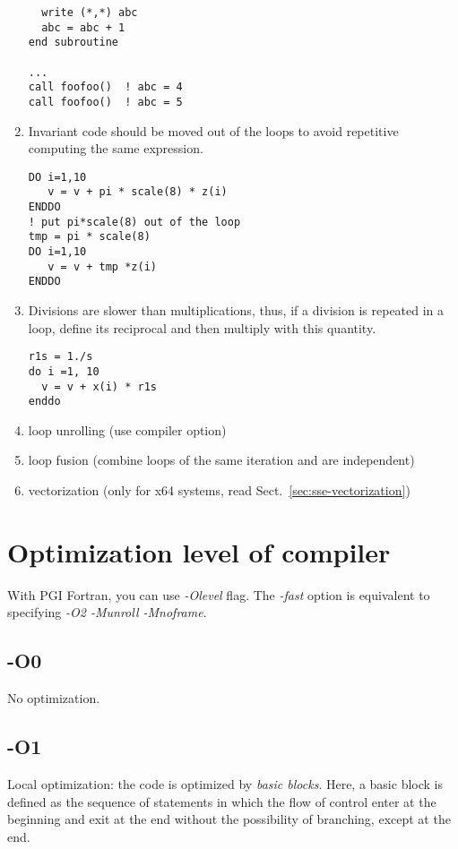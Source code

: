 \begin{enumerate}
\begin{verbatim}
  write (*,*) abc
  abc = abc + 1
end subroutine

...
call foofoo()  ! abc = 4
call foofoo()  ! abc = 5
\end{verbatim}

\item Invariant code should be moved out of the loops to avoid
  repetitive computing the same expression.
\begin{lstlisting}
DO i=1,10
   v = v + pi * scale(8) * z(i)
ENDDO
! put pi*scale(8) out of the loop
tmp = pi * scale(8)
DO i=1,10 
   v = v + tmp *z(i)
ENDDO
\end{lstlisting}

\item Divisions are slower than multiplications, thus, if a division
  is repeated in a loop, define its reciprocal and then multiply with
  this quantity.
\begin{lstlisting}
r1s = 1./s
do i =1, 10
  v = v + x(i) * r1s
enddo
\end{lstlisting}

\item loop unrolling (use compiler option)

\item loop fusion (combine loops of the same iteration and are
  independent) 

\item vectorization (only for x64 systems, read
  Sect.~\ref{sec:sse-vectorization})
\end{enumerate}

\section{Optimization level of compiler}
\label{sec:optimization-level}

With PGI Fortran, you can use {\it -Olevel} flag.  The {\it -fast}
option is equivalent to specifying {\it -O2 -Munroll -Mnoframe}.

\subsection{-O0}
\label{sec:-o0}

No optimization. 

\subsection{-O1}
\label{sec:-o1}

Local optimization: the code is optimized by {\it basic blocks}. Here,
a basic block is defined as the sequence of statements in which the
flow of control enter at the beginning and exit at the end without the
possibility of branching, except at the end. 

